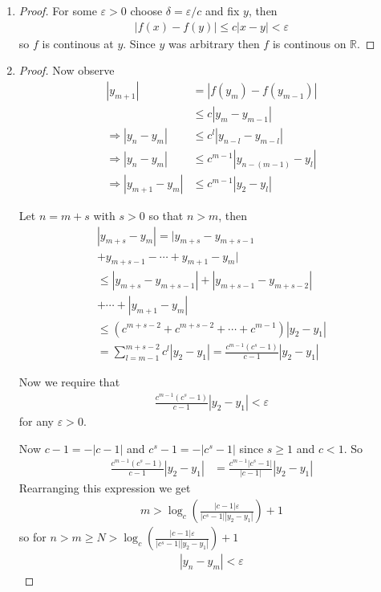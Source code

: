 \begin{enumerate}[label=(\alph*)]
    \item 
    \begin{proof}
        For some $\varepsilon>0$ choose $\delta = \varepsilon/c$ and 
        fix $y$, then  
        \begin{align*}
            |f(x)-f(y)| \leq c|x-y| < \varepsilon
        \end{align*}
        so $f$ is continous at $y$. Since $y$ was arbitrary then $f$ is
        continous on $\mathbb{R}$.
    \end{proof}

    \item
    \begin{proof}
        Now observe 
        \begin{align*}
            |y_{m+1}| &= |f(y_m)-f(y_{m-1})| \\ 
            &\leq c |y_m - y_{m-1}| \\
            \Rightarrow |y_n - y_m| &\leq c^l|y_{n-l} - y_{m-l}| \\
            \Rightarrow |y_n - y_m| &\leq c^{m-1}|y_{n-(m-1)} - y_{l}| \\
            \Rightarrow |y_{m+1} - y_m| &\leq c^{m-1}|y_2 - y_{l}|
        \end{align*}

        Let $n=m+s$ with $s>0$ so that $n>m$, then 
        \begin{multline*}
            |y_{m+s} - y_m| = |y_{m+s} - y_{m+s-1} \\ + y_{m+s-1} - \cdots + y_{m+1} - y_m| \\
            \leq |y_{m+s} - y_{m+s-1}| + |y_{m+s-1} - y_{m+s-2}| \\  + \cdots + |y_{m+1} - y_m| \\
            \leq (c^{m+s-2}+c^{m+s-2}+\cdots+c^{m-1})|y_2-y_1| \\
            = \sum_{l=m-1}^{m+s-2} c^l |y_2-y_1| 
            = \frac{c^{m-1}(c^s-1)}{c-1} |y_2-y_1|
        \end{multline*}

        Now we require that
        \begin{align*}
            \frac{c^{m-1}(c^s-1)}{c-1} |y_2-y_1| < \varepsilon
        \end{align*}
        for any $\varepsilon>0$.

        Now $c-1 = -|c-1|$ and $c^s-1 = -|c^s-1|$ since $s\geq 1$ and $c<1$. So
        \begin{align*}
            \frac{c^{m-1}(c^s-1)}{c-1} |y_2-y_1| &= \frac{c^{m-1}|c^s-1|}{|c-1|} |y_2-y_1|
        \end{align*}
        Rearranging this expression we get
        \begin{align*}
            m > \log_c\left( \frac{|c-1|\varepsilon}{|c^s-1||y_2-y_1|} \right) + 1
        \end{align*}
        so for $n>m\geq N>\log_c\left( \frac{|c-1|\varepsilon}{|c^s-1||y_2-y_1|} \right) + 1$
        \begin{align*}
            |y_n-y_m| <\varepsilon
        \end{align*}
    \end{proof}


\end{enumerate}
